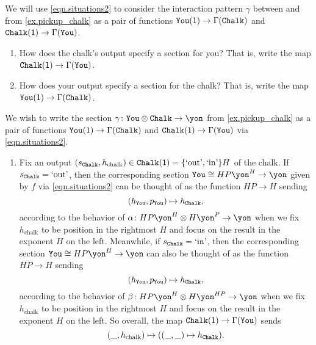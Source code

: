 \documentclass[Book-Poly]{subfiles}
\begin{document}

\begin{exercise}
We will use \eqref{eqn.situations2} to consider the interaction pattern $\gamma$ between  and  from \cref{ex.pickup_chalk} as a pair of functions $\texttt{You}(\textsf{1})\to\Gamma(\texttt{Chalk})$ and $\texttt{Chalk}(\textsf{1})\to\Gamma(\texttt{You})$.
\begin{enumerate}
	\item How does the chalk's output specify a section for you? That is, write the map $\texttt{Chalk}(\textsf{1})\to\Gamma(\texttt{You})$.
	\item How does your output specify a section for the chalk? That is, write the map $\texttt{You}(\textsf{1})\to\Gamma(\texttt{Chalk})$.
\qedhere
\end{enumerate}
\begin{solution}
We wish to write the section $\gamma\colon\const{You}\otimes\const{Chalk}\to\yon$ from \cref{ex.pickup_chalk} as a pair of functions $\texttt{You}(\textsf{1})\to\Gamma(\texttt{Chalk})$ and $\texttt{Chalk}(\textsf{1})\to\Gamma(\texttt{You})$ via \eqref{eqn.situations2}.
\begin{enumerate}
    \item Fix an output $(s_{\texttt{Chalk}}, h_\text{chalk})\in\texttt{Chalk}(\textsf{1})=\{\text{`out'},\text{`in'}\}H$ of the chalk.
    If $s_{\texttt{Chalk}}=\text{`out'}$, then the corresponding section $\const{You}\iso HP\yon^H\to\yon$ given by $f$ via \eqref{eqn.situations2} can be thought of as the function $HP\to H$ sending
    \[
        (h_{\texttt{You}},p_{\texttt{You}})\mapsto h_{\texttt{Chalk}},
    \]
    according to the behavior of $\alpha\colon HP\yon^H\otimes H\yon^P\to\yon$ when we fix $h_\text{chalk}$ to be position in the rightmost $H$ and focus on the result in the exponent $H$ on the left.
    Meanwhile, if $s_{\texttt{Chalk}}=\text{`in'}$, then the corresponding section $\const{You}\iso HP\yon^H\to\yon$ can also be thought of as the function $HP\to H$ sending
    \[
        (h_{\texttt{You}},p_{\texttt{You}})\mapsto h_{\texttt{Chalk}},
    \]
    according to the behavior of $\beta\colon HP\yon^H\otimes H\yon^{HP}\to\yon$ when we fix $h_\text{chalk}$ to be position in the rightmost $H$ and focus on the result in the exponent $H$ on the left.
    So overall, the map $\texttt{Chalk}(\textsf{1})\to\Gamma(\texttt{You})$ sends
    \[
        (\_,h_\text{chalk})\mapsto((\_,\_)\mapsto h_{\texttt{Chalk}}).
    \]


\end{enumerate}
\end{solution}
\end{exercise}
\end{document}
